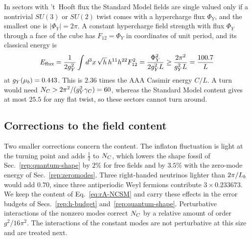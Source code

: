 In sectors with 't~Hooft flux the Standard Model fields are single valued only if a nontrivial $SU(3)$ or $SU(2)$ twist comes with a hypercharge flux $\Phi_Y$, and the smallest one is $|\Phi_Y|=2\pi$.
A constant hypercharge field strength with flux $\Phi_Y$ through a face of the cube has $F_{12}=\Phi_Y$ in coordinates of unit period, and its classical energy is
\begin{equation}
E_{\rm flux}=\frac{1}{2g_Y^2}\int d^3x\,\sqrt h\,h^{11}h^{22}F_{12}^2=\frac{\Phi_Y^2}{2g_Y^2L}\geq\frac{2\pi^2}{g_Y^2L}=\frac{100.7}{L}
\label{eq:rA-flux}
\end{equation}
at $g_Y(\mu_b)=0.443$. %
This is $2.36$ times the AAA Casimir energy $C/L$. %
A turn would need $N_C>2\pi^2/(g_Y^2\gamma_C)=60$, whereas the Standard Model content gives at most $25.5$ for any flat twist, so these sectors cannot turn around. %

\subsection{Corrections to the field content}
\label{rA:content-corr}

Two smaller corrections concern the content.
The inflaton fluctuation is light at the turning point and adds $\tfrac12$ to $N_C$, which lowers the shape fossil of Sec.~\ref{rep:quantum-shape} by $2\%$ for free fields and by $3.5\%$ with the zero-mode energy of Sec.~\ref{rep:zeromodes}. %
Three right-handed neutrinos lighter than $2\pi/L_b$ would add $0.70$, since three antiperiodic Weyl fermions contribute $3\times0.233673$. %
We keep the content of Eq.~\eqref{eq:rA-NCSM} and carry these effects in the error budgets of Secs.~\ref{rep:h-budget} and~\ref{rep:quantum-shape}.
Perturbative interactions of the nonzero modes correct $N_C$ by a relative amount of order $g^2/16\pi^2$.
The interactions of the constant modes are not perturbative at this size and are treated next.
